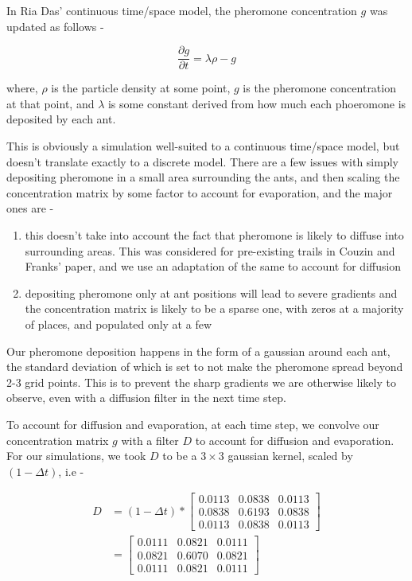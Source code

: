 In Ria Das' continuous time/space model, the pheromone concentration $g$ was updated as follows - 

\begin{equation}
    \frac{\partial g}{\partial t} = \lambda \rho - g
    \label{eqn:pheromone}
\end{equation}

where, $\rho$ is the particle density at some point, $g$ is the pheromone concentration at that point, and $\lambda$ is some constant derived from how much each phoeromone is deposited by each ant.

This is obviously a simulation well-suited to a continuous time/space model, but doesn't translate exactly to a discrete model. There are a few issues with simply depositing pheromone in a small area surrounding the ants, and then scaling the concentration matrix by some factor to account for evaporation, and the major ones are -

\begin{enumerate}
    \item this doesn't take into account the fact that pheromone is likely to diffuse into surrounding areas. This was considered for pre-existing trails in Couzin and Franks' paper, and we use an adaptation of the same to account for diffusion
    \item depositing pheromone only at ant positions will lead to severe gradients and the concentration matrix is likely to be a sparse one, with zeros at a majority of places, and populated only at a few
\end{enumerate}

Our pheromone deposition happens in the form of a gaussian around each ant, the standard deviation of which is set to not make the pheromone spread beyond 2-3 grid points. This is to prevent the sharp gradients we are otherwise likely to observe, even with a diffusion filter in the next time step.

To account for diffusion and evaporation, at each time step, we convolve our concentration matrix $g$ with a filter $D$ to account for diffusion and evaporation. For our simulations, we took $D$ to be a $3 \times 3$ gaussian kernel, scaled by $(1 - \Delta t)$, i.e - 

\begin{align*}
    D & = (1 - \Delta t) *
    \begin{bmatrix}
        0.0113  &  0.0838  &  0.0113 \\
        0.0838  &  0.6193  &  0.0838 \\
        0.0113  &  0.0838  &  0.0113
    \end{bmatrix} \\
    & = 
    \begin{bmatrix}
        0.0111  &  0.0821  &  0.0111 \\
        0.0821  &  0.6070  &  0.0821 \\
        0.0111  &  0.0821  &  0.0111
    \end{bmatrix}
\end{align*}

